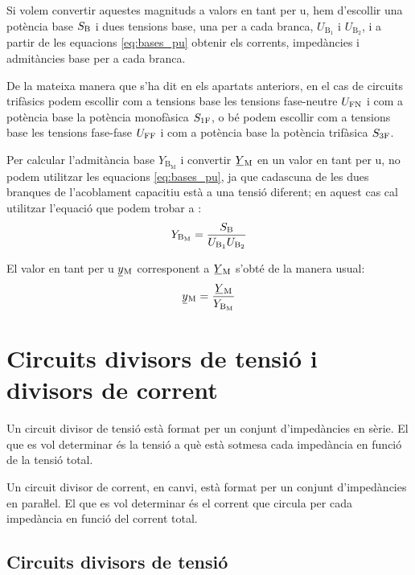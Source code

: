 Si volem convertir aquestes magnituds a valors en tant per u, hem d'escollir  una potència base $S_\mathrm{B}$ i dues tensions base, una  per a cada branca, $U_{\text{B}_1}$ i  $U_{\text{B}_2}$, i a partir de les equacions \eqref{eq:bases_pu} obtenir els corrents, impedàncies i admitàncies base per a cada branca.

De la mateixa manera que s'ha dit en els apartats anteriors, en el cas de circuits trifàsics podem escollir com a tensions base les tensions fase-neutre $U_\mathrm{FN}$ i com a potència base la potència  monofàsica $S_\mathrm{1F}$, o bé podem escollir com a tensions base les tensions fase-fase $U_\mathrm{FF}$ i com a potència base la potència trifàsica $S_\mathrm{3F}$.


Per  calcular l'admitància base $Y_{\text{B}_\text{M}}$ i convertir $\cmplx{Y}\ped{M}$ en un valor en tant per u, no podem utilitzar les equacions \eqref{eq:bases_pu}, ja que cadascuna de les dues branques de l'acoblament capacitiu està a una tensió diferent; en aquest cas cal utilitzar l'equació que podem trobar a \cite{TLE}:
\begin{equation}
    Y_{\text{B}_\text{M}} = \frac{S_\mathrm{B}}{U_{\text{B}_1} U_{\text{B}_2}}
\end{equation}

El valor en tant per u $\cmplx{y}\ped{M}$ corresponent a $\cmplx{Y}\ped{M}$ s'obté de la manera usual:
\begin{equation}
    \cmplx{y}\ped{M} = \frac{\cmplx{Y}\ped{M}}{Y_{\text{B}_\text{M}}}
\end{equation}


\section{Circuits divisors de tensió i divisors de corrent}\label{sec:div_tens_corr}

Un circuit divisor de tensió està format per un conjunt
d'impedàncies en sèrie. El que es vol determinar  és  la
tensió a què està sotmesa cada impedància en funció de la tensió total.

Un circuit divisor de corrent, en canvi, està format per un conjunt
d'impedàncies en paraŀlel. El que es vol determinar és el
corrent que circula per cada impedància en funció del corrent
total.

\subsection{Circuits divisors de tensió}\label{sec:circ-div-tens}


